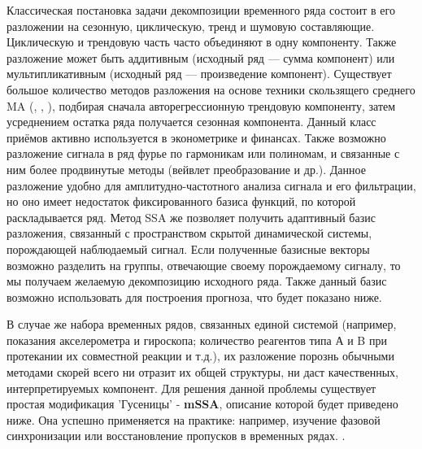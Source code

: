 		Классическая постановка задачи декомпозиции временного ряда состоит в его разложении на сезонную, циклическую, тренд и шумовую составляющие. Циклическую и трендовую часть часто объединяют в одну компоненту. Также разложение может быть аддитивным (исходный ряд --- сумма компонент) или мультипликативным (исходный ряд --- произведение компонент). Существует большое количество методов разложения на основе техники скользящего среднего MA (\cite{enders2010applied}, \cite{x11}, \cite{cleveland90}), подбирая сначала авторегрессионную трендовую компоненту, затем усреднением остатка ряда получается сезонная компонента. Данный класс приёмов активно используется в эконометрике и финансах. Также возможно разложение сигнала в ряд фурье по гармоникам или полиномам, и связанные с ним более продвинутые методы (вейвлет преобразование и др.). Данное разложение удобно для амплитудно-частотного анализа сигнала и его фильтрации, но оно имеет недостаток фиксированного базиса функций, по которой раскладывается ряд. Метод SSA же позволяет получить адаптивный базис разложения, связанный с пространством скрытой динамической системы, порождающей наблюдаемый сигнал. Если полученные базисные векторы возможно разделить на группы, отвечающие своему порождаемому сигналу, то мы получаем желаемую декомпозицию исходного ряда. Также данный базис возможно использовать для построения прогноза, что будет показано ниже.
		
		В случае же набора временных рядов, связанных единой системой (например, показания акселерометра и гироскопа; количество реагентов типа А и B при протекании их совместной реакции и т.д.), их разложение порознь обычными методами скорей всего ни отразит их общей структуры, ни даст качественных, интерпретируемых компонент. Для решения данной проблемы существует простая модификация 'Гусеницы' - \textbf{mSSA}, описание которой будет приведено ниже. Она успешно применяется на практике: например, изучение фазовой синхронизации \cite{PhysRevE.84.036206} или восстановление пропусков в временных рядах. \cite{agarwal2020multivariate}.
		
